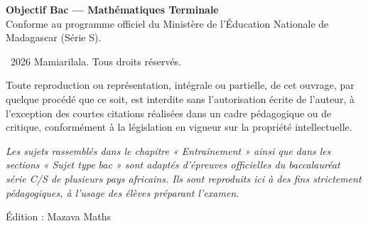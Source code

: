 \thispagestyle{empty}

\vspace*{3cm}

{\large\bfseries Objectif Bac --- Mathématiques Terminale}\\[0.3em]
Conforme au programme officiel du Ministère de l'Éducation Nationale de Madagascar (Série S).

\vspace{2cm}

\textcopyright\ 2026 Mamiarilala. Tous droits réservés.

\medskip
\noindent
Toute reproduction ou représentation, intégrale ou partielle, de cet ouvrage, par quelque procédé que ce soit, est interdite sans l'autorisation écrite de l'auteur, à l'exception des courtes citations réalisées dans un cadre pédagogique ou de critique, conformément à la législation en vigueur sur la propriété intellectuelle.

\vspace{1cm}

\noindent
\textit{Les sujets rassemblés dans le chapitre « Entraînement » ainsi que dans les sections « Sujet type bac » sont adaptés d'épreuves officielles du baccalauréat série C/S de plusieurs pays africains. Ils sont reproduits ici à des fins strictement pédagogiques, à l'usage des élèves préparant l'examen.}

\vspace{1cm}

\noindent
Édition : Mazava Maths
